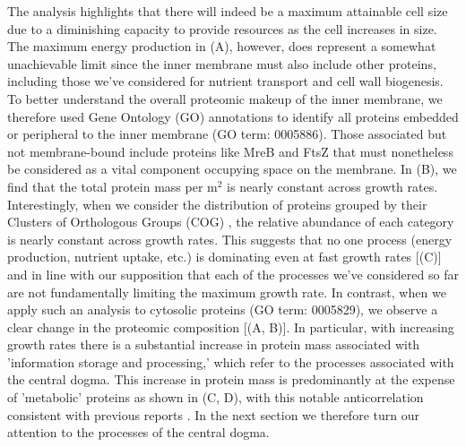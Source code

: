 The analysis highlights that there will indeed be a maximum attainable cell size
due to a diminishing capacity to provide resources as the cell increases in
size. The maximum energy production in (A), however, does
represent a somewhat unachievable limit since the inner membrane must also
include other proteins, including those we've considered for nutrient transport
and cell wall biogenesis. To better understand the overall proteomic makeup of
the inner membrane, we therefore used Gene Ontology (GO) annotations
\citep{ashburner2000, thegeneOntologyconsortium2018} to identify all proteins
embedded or peripheral to the inner membrane (GO term: 0005886). Those
associated but not membrane-bound include proteins like MreB and FtsZ that must
nonetheless be considered as a vital component occupying space on the membrane.
In (B), we find that the total protein mass per \textmu
m$^2$ is nearly constant across growth rates. Interestingly, when we consider
the distribution of proteins grouped by their Clusters of Orthologous Groups
(COG) \citep{tatusov2000}, the relative abundance of each category is nearly
constant across growth rates. This suggests that no one process (energy
production, nutrient uptake, etc.) is dominating even at fast growth rates
[(C)] and in line with our supposition that each of the
processes we've considered so far are not fundamentally limiting the maximum
growth rate. In contrast, when we apply such an analysis to cytosolic proteins
(GO term: 0005829), we observe a clear change in the proteomic composition
[(A, B)]. In particular, with increasing
growth rates there is a substantial increase in protein mass associated with
'information storage and processing,' which refer to the processes associated
with the central dogma. This increase in protein mass is predominantly at the
expense of 'metabolic' proteins  as shown in (C, D),
with this notable anticorrelation consistent with previous reports
\citep{schmidt2016, scott2010, zhu2019}. In the next section we therefore turn
our attention to the processes of the central dogma.

